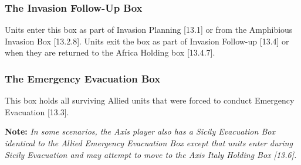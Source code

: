 \subsubsection{\textbf{The Invasion Follow-Up Box}}
Units enter this box as part of Invasion Planning [13.1] or from the Amphibious Invasion Box [13.2.8]. Units exit the box as part of Invasion Follow-up [13.4] or when they are returned to the Africa Holding box [13.4.7].

\subsubsection{\textbf{The Emergency Evacuation Box}}
This box holds all surviving Allied units that were forced to conduct Emergency Evacuation [13.3].

\textbf{Note:} \textit{In some scenarios, the Axis player also has a Sicily Evacuation Box identical to the Allied Emergency Evacuation Box except that units enter during Sicily Evacuation and may attempt to move to the Axis Italy Holding Box [13.6].}